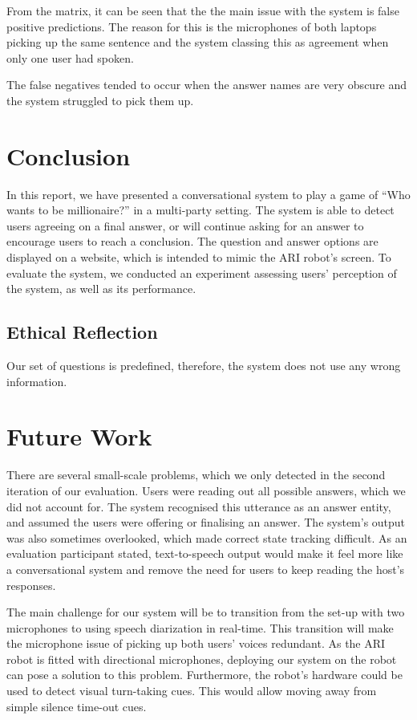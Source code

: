\documentclass[hidelinks, 11pt]{article}
\begin{document}
From the matrix, it can be seen that the the main issue with the system is false positive predictions. The reason for this is the microphones of both laptops picking up the same sentence and the system classing this as agreement when only one user had spoken.

The false negatives tended to occur when the answer names are very obscure and the system struggled to pick them up.
\section{Conclusion}
\label{sec:conclusion}

In this report, we have presented a conversational system to play a game of ``Who wants to be millionaire?'' in a multi-party setting. The system is able to detect users agreeing on a final answer, or will continue asking for an answer to encourage users to reach a conclusion. The question and answer options are displayed on a website, which is intended to mimic the ARI robot's screen.
To evaluate the system, we conducted an experiment assessing users' perception of the system, as well as its performance.

\subsection{Ethical Reflection}
\label{subsec:ethics}
Our set of questions is predefined, therefore, the system does not use any wrong information.


\section{Future Work}
\label{sec:future_work}

There are several small-scale problems, which we only detected in the second iteration of our evaluation. Users were reading out all possible answers, which we did not account for. The system recognised this utterance as an answer entity, and assumed the users were offering or finalising an answer. The system's output was also sometimes overlooked, which made correct state tracking difficult. As an evaluation participant stated, text-to-speech output would make it feel more like a conversational system and remove the need for users to keep reading the host's responses.

The main challenge for our system will be to transition from the set-up with two microphones to using speech diarization in real-time. This transition will make the microphone issue of picking up both users' voices redundant. As the ARI robot is fitted with directional microphones, deploying our system on the robot can pose a solution to this problem. Furthermore, the robot's hardware could be used to detect visual turn-taking cues. This would allow moving away from simple silence time-out cues.
\end{document}
